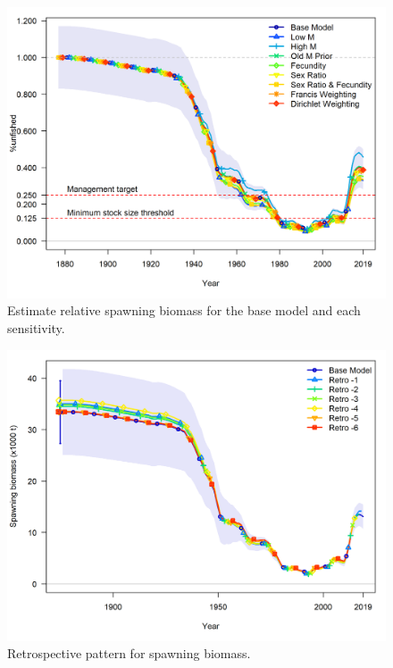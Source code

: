 \documentclass[12pt,]{article}
\begin{document}
\FloatBarrier

\begin{figure}
\centering
\includegraphics{Figures/depl_sens.png}
\caption{Estimate relative spawning biomass for the base model and each
sensitivity. \label{fig:sens_depl}}
\end{figure}

\FloatBarrier

\begin{figure}
\centering
\includegraphics{Figures/retro_ssb_5.png}
\caption{Retrospective pattern for spawning biomass.
\label{fig:retro_ssb}}
\end{figure}
\end{document}
